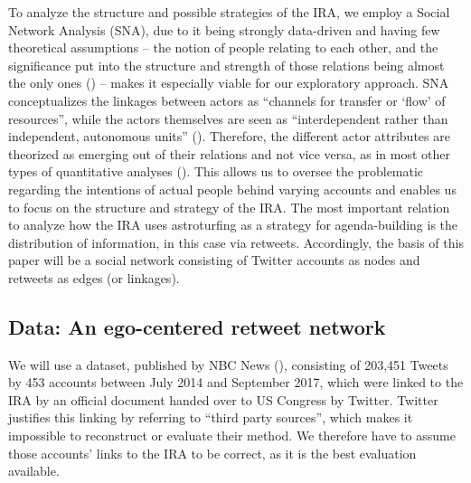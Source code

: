 \documentclass[12pt, titlepage=true, toc=bib]{scrartcl}
\begin{document}
To analyze the structure and possible strategies of the IRA, we employ a Social Network Analysis (SNA), due to it being strongly data-driven and having few theoretical assumptions -- the notion of people relating to each other, and the significance put into the structure and strength of those relations being almost the only ones (\cite[982]{golovchenko_state_2018}) -- makes it especially viable for our exploratory approach. SNA conceptualizes the linkages between actors as \enquote{channels for transfer or \enquote{flow} of resources}, while the actors themselves are seen as ``interdependent rather than independent, autonomous units'' (\cite[4]{wasserman_social_1994}). Therefore, the different actor attributes are theorized as emerging out of their relations and not vice versa, as in most other types of quantitative analyses (\cite[8]{wasserman_social_1994}). This allows us to oversee the problematic regarding the intentions of actual people behind varying accounts and enables us to focus on the structure and strategy of the IRA. The most important relation to analyze how the IRA uses astroturfing as a strategy for agenda-building is the distribution of information, in this case via retweets. Accordingly, the basis of this paper will be a social network consisting of Twitter accounts as nodes and retweets as edges (or linkages).


\subsection{Data: An ego-centered retweet network}

We will use a dataset, published by NBC News (\cite*{popken_twitter_2018}), consisting of 203,451 Tweets by 453 accounts between July 2014 and September 2017, which were linked to the IRA by an official document handed over to US Congress by Twitter. Twitter justifies this linking by referring to ``third party sources'', which makes it impossible to reconstruct or evaluate their method. We therefore have to assume those accounts' links to the IRA to be correct, as it is the best evaluation available.
\end{document}

